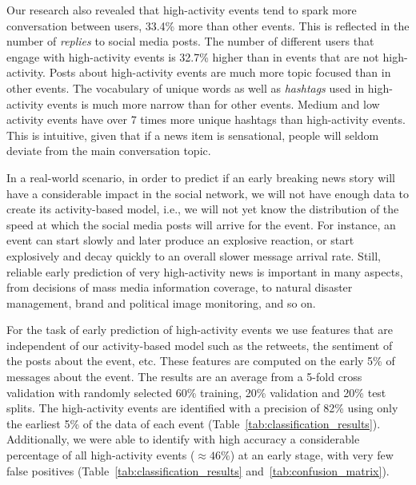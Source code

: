 \documentclass[10pt,letterpaper]{article}
\begin{document}
Our research also revealed that high-activity events tend to spark more conversation
between users, 33.4\% more than other events. This is reflected in the
number of {\em replies} to social media posts. The number of different
users that engage with high-activity events is 32.7\% higher than in
events that are not high-activity. Posts about high-activity events are
much more topic focused than in other events. The vocabulary of unique
words as well as {\em hashtags} used in high-activity events is much
more narrow than for other events. Medium and low activity events have
over 7 times more unique hashtags than high-activity events. This is
intuitive, given that if a news item is sensational, people will
seldom deviate from the main conversation topic.


In a real-world scenario, in order to predict if an early breaking
news story will have a considerable impact in the social network, we
will not have enough data to create its activity-based model, i.e., we
will not yet know the distribution of the speed at which the social
media posts will arrive for the event. For instance, an event can
start slowly and later produce an explosive reaction, or start
explosively and decay quickly to an overall slower message arrival
rate. Still, reliable early prediction of very high-activity news is
important in many aspects, from decisions of mass media information
coverage, to natural disaster management, brand and political image
monitoring, and so on.

For the task of early prediction of high-activity events we use features 
that are independent of our activity-based model such as
the retweets, the sentiment of the posts about the event, etc. 
These features are computed on the early 5\% of messages about the event.
The results are an average from a 5-fold cross validation with
randomly selected 60\% training, 20\% validation and 20\% test splits.
The high-activity events are identified with a precision of 82\% using
only the earliest 5\% of the data of each event
(Table~\ref{tab:classification_results}).  Additionally, we were able to
identify with high accuracy a considerable percentage of all
high-activity events ($\approx 46\%$) at an early stage, with very few
false positives (Table~\ref{tab:classification_results} and~\ref{tab:confusion_matrix}).
\end{document}
